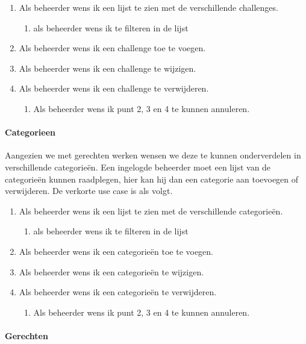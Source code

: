 \begin{enumerate}
	\item Als beheerder wens ik een lijst te zien met de verschillende challenges.
	\begin{enumerate}
		\item als beheerder wens ik te filteren in de lijst
	\end{enumerate}
	\item Als beheerder wens ik een challenge toe te voegen.
	\item Als beheerder wens ik een challenge te wijzigen.
	\item Als beheerder wens ik een challenge te verwijderen.
	\begin{enumerate}
		\item Als beheerder wens ik punt 2, 3 en 4 te kunnen annuleren.
	\end{enumerate}
\end{enumerate}


\paragraph{Categorieen}

Aangezien we met gerechten werken wensen we deze te kunnen onderverdelen in verschillende
categorieën. Een ingelogde beheerder moet een lijst van de categorieën kunnen raadplegen,
hier kan hij dan een categorie aan toevoegen of verwijderen. De verkorte use case is als
volgt.

\begin{enumerate}
	\item Als beheerder wens ik een lijst te zien met de verschillende categorieën.
	\begin{enumerate}
		\item als beheerder wens ik te filteren in de lijst
	\end{enumerate}
	\item Als beheerder wens ik een categorieën toe te voegen.
	\item Als beheerder wens ik een categorieën te wijzigen.
	\item Als beheerder wens ik een categorieën te verwijderen.
	\begin{enumerate}
		\item Als beheerder wens ik punt 2, 3 en 4 te kunnen annuleren.
	\end{enumerate}
\end{enumerate}

\paragraph{Gerechten}

